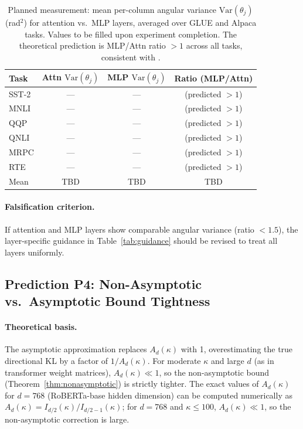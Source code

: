 \documentclass[11pt]{article}
\newcommand{\Ad}{A_d}
\begin{document}
\begin{table}[ht]
\centering
\caption{Planned measurement: mean per-column angular variance
  $\mathrm{Var}(\theta_j)$ (rad$^2$) for attention vs.\ MLP layers,
  averaged over GLUE and Alpaca tasks.
  Values to be filled upon experiment completion.
  The theoretical prediction is MLP/Attn ratio $> 1$ across all tasks,
  consistent with \cite{tanwar2025domain}.}
\label{tab:variance}
\begin{tabular}{lccc}
\toprule
Task & Attn $\mathrm{Var}(\theta_j)$ &
  MLP $\mathrm{Var}(\theta_j)$ & Ratio (MLP/Attn) \\
\midrule
SST-2  & --- & --- & (predicted $> 1$) \\
MNLI   & --- & --- & (predicted $> 1$) \\
QQP    & --- & --- & (predicted $> 1$) \\
QNLI   & --- & --- & (predicted $> 1$) \\
MRPC   & --- & --- & (predicted $> 1$) \\
RTE    & --- & --- & (predicted $> 1$) \\
\midrule
Mean   & TBD & TBD & TBD \\
\bottomrule
\end{tabular}
\end{table}

\paragraph{Falsification criterion.}
If attention and MLP layers show comparable angular variance (ratio $< 1.5$),
the layer-specific guidance in Table~\ref{tab:guidance} should be revised
to treat all layers uniformly.

\subsection{Prediction P4: Non-Asymptotic vs.\ Asymptotic Bound Tightness}
\label{sec:ablation}

\paragraph{Theoretical basis.}
The asymptotic approximation replaces $\Ad(\kappa)$ with 1, overestimating
the true directional KL by a factor of $1/\Ad(\kappa)$.
For moderate $\kappa$ and large $d$ (as in transformer weight matrices),
$\Ad(\kappa) \ll 1$, so the non-asymptotic bound
(Theorem~\ref{thm:nonasymptotic}) is strictly tighter.
The exact values of $\Ad(\kappa)$ for $d = 768$ (RoBERTa-base hidden
dimension) can be computed numerically as
$\Ad(\kappa) = I_{d/2}(\kappa)/I_{d/2-1}(\kappa)$;
for $d = 768$ and $\kappa \leq 100$, $\Ad(\kappa) \ll 1$, so the
non-asymptotic correction is large.
\end{document}
